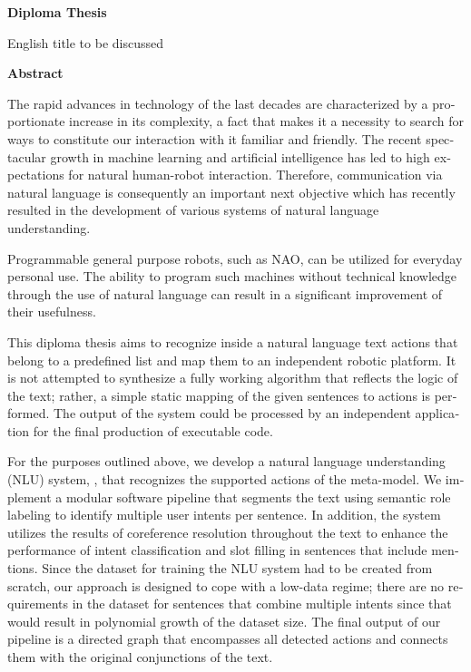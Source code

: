 \begin{english}
{}

\begin{center}
    \centering
    \textbf{\Large{Diploma Thesis}}

    \vspace{0.3cm}
    \large{English title to be discussed}

    \vspace{0.1cm}
    \centering
    \textbf{Abstract}
\end{center}

The rapid advances in technology of the last decades are characterized by a proportionate increase in its complexity, a fact that makes it a necessity to search for ways to constitute our interaction with it familiar and friendly.
The recent spectacular growth in machine learning and artificial intelligence has led to high expectations for natural human-robot interaction.
Therefore, communication via natural language is consequently an important next objective which has recently resulted in the development of various systems of natural language understanding.

Programmable general purpose robots, such as NAO, can be utilized for everyday personal use.
The ability to program such machines without technical knowledge through the use of natural language can result in a significant improvement of their usefulness.

This diploma thesis aims to recognize inside a natural language text actions that belong to a predefined list and map them to an independent robotic platform.
It is not attempted to synthesize a fully working algorithm that reflects the logic of the text; rather, a simple static mapping of the given sentences to actions is performed.
The output of the system could be processed by an independent application for the final production of executable code.

For the purposes outlined above, we develop a natural language understanding (NLU) system, \projectname{}, that recognizes the supported actions of the \metamodel{} meta-model.
We implement a modular software pipeline that segments the text using semantic role labeling to identify multiple user intents per sentence.
In addition, the system utilizes the results of coreference resolution throughout the text to enhance the performance of intent classification and slot filling in sentences that include mentions.
Since the dataset for training the NLU system had to be created from scratch, our approach is designed to cope with a low-data regime;
there are no requirements in the dataset for sentences that combine multiple intents since that would result in polynomial growth of the dataset size.
The final output of our pipeline is a directed graph that encompasses all detected actions and connects them with the original conjunctions of the text.


\end{english}
